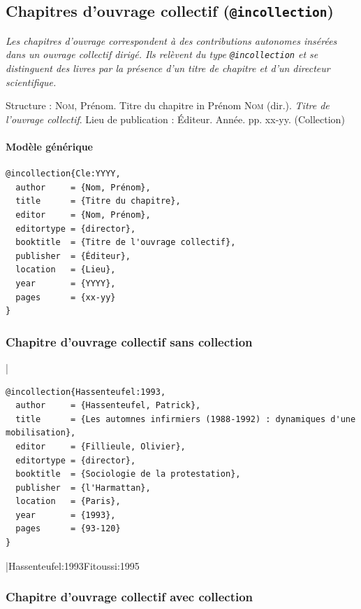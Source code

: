 \documentclass{article}
\begin{document}
\subsection{Chapitres d'ouvrage collectif (\texttt{@incollection})}

\emph{Les chapitres d'ouvrage correspondent à des contributions autonomes
	insérées dans un ouvrage collectif dirigé. Ils relèvent du type
	\texttt{@incollection} et se distinguent des livres par la présence d'un titre
	de chapitre et d'un directeur scientifique.}

Structure : \textsc{Nom}, Prénom. \og Titre du chapitre \fg{} in Prénom \textsc{Nom} (dir.). \textit{Titre de l'ouvrage collectif}. Lieu de publication : Éditeur. Année. pp. xx-yy. (Collection)

\paragraph{Modèle générique}

\begin{verbatim}
@incollection{Cle:YYYY,
  author     = {Nom, Prénom},
  title      = {Titre du chapitre},
  editor     = {Nom, Prénom},
  editortype = {director},
  booktitle  = {Titre de l'ouvrage collectif},
  publisher  = {Éditeur},
  location   = {Lieu},
  year       = {YYYY},
  pages      = {xx-yy}
}
\end{verbatim}

\subsubsection{Chapitre d'ouvrage collectif sans collection}

|
\begin{verbatim}
@incollection{Hassenteufel:1993,
  author     = {Hassenteufel, Patrick},
  title      = {Les automnes infirmiers (1988-1992) : dynamiques d'une mobilisation},
  editor     = {Fillieule, Olivier},
  editortype = {director},
  booktitle  = {Sociologie de la protestation},
  publisher  = {l'Harmattan},
  location   = {Paris},
  year       = {1993},
  pages      = {93-120}
}
\end{verbatim}
|{Hassenteufel:1993}{Fitoussi:1995}

\subsubsection{Chapitre d'ouvrage collectif avec collection}
\end{document}
